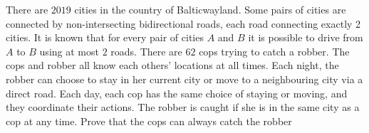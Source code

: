 There are $2019$ cities in the country of Balticwayland. Some pairs of cities are connected by non-intersecting bidirectional roads, each road connecting exactly 2 cities. It is known that for every pair of cities $A$ and $B$ it is possible to drive from $A$ to $B$ using at most $2$ roads. There are $62$ cops trying to catch a robber. The cops and robber all know each others’ locations at all times. Each night, the robber can choose to stay in her current city or move to a neighbouring city via a direct road. Each day, each cop has the same choice of staying or moving, and they coordinate their actions. The robber is caught if she is in the same city as a cop at any time. Prove that the cops can always catch the robber
